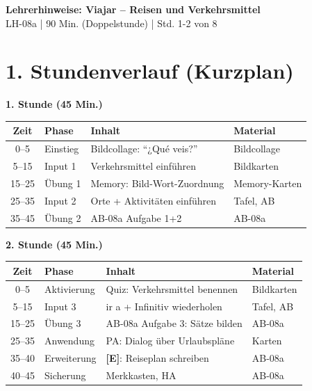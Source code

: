 \documentclass[11pt, a4paper]{article}
\newcommand{\fachfarbe}{spanisch}
\newcommand{\thema}{Viajar -- Reisen und Verkehrsmittel}
\newcommand{\sequenz}{08}
\newcommand{\block}{a}
\newcommand{\dauer}{90 Min. (Doppelstunde)}
\newcommand{\E}{\textcolor{erweiterung}{\textbf{[E]}}}
\begin{document}
\begin{center}
    {\Large\bfseries\textcolor{\fachfarbe}{Lehrerhinweise: \thema}}\\[0.3em]
    {\normalsize LH-\sequenz\block{} | \dauer{} | Std. 1-2 von 8}
\end{center}

\vspace{10pt}


\section*{1. Stundenverlauf (Kurzplan)}

\textbf{1. Stunde (45 Min.)}

\begin{tabularx}{\textwidth}{|c|l|X|l|}
\hline
\textbf{Zeit} & \textbf{Phase} & \textbf{Inhalt} & \textbf{Material} \\
\hline
0--5 & Einstieg & Bildcollage: ``¿Qué veis?'' & Bildcollage \\
\hline
5--15 & Input 1 & Verkehrsmittel einführen & Bildkarten \\
\hline
15--25 & Übung 1 & Memory: Bild-Wort-Zuordnung & Memory-Karten \\
\hline
25--35 & Input 2 & Orte + Aktivitäten einführen & Tafel, AB \\
\hline
35--45 & Übung 2 & AB-08a Aufgabe 1+2 & AB-08a \\
\hline
\end{tabularx}

\vspace{1em}

\textbf{2. Stunde (45 Min.)}

\begin{tabularx}{\textwidth}{|c|l|X|l|}
\hline
\textbf{Zeit} & \textbf{Phase} & \textbf{Inhalt} & \textbf{Material} \\
\hline
0--5 & Aktivierung & Quiz: Verkehrsmittel benennen & Bildkarten \\
\hline
5--15 & Input 3 & ir a + Infinitiv wiederholen & Tafel, AB \\
\hline
15--25 & Übung 3 & AB-08a Aufgabe 3: Sätze bilden & AB-08a \\
\hline
25--35 & Anwendung & PA: Dialog über Urlaubspläne & Karten \\
\hline
35--40 & Erweiterung & \E{}: Reiseplan schreiben & AB-08a \\
\hline
40--45 & Sicherung & Merkkasten, HA & AB-08a \\
\hline
\end{tabularx}
\end{document}
